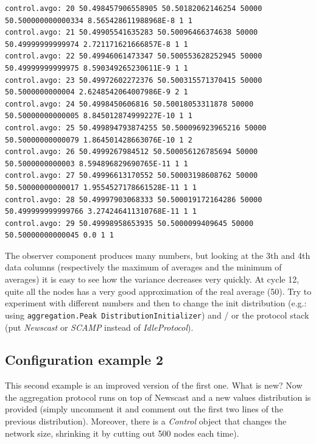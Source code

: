 \documentclass[a4paper,11pt]{article}
\begin{document}
\begin{verbatim}
control.avgo: 20 50.498457906558905 50.50182062146254 50000 50.500000000000334 8.565428611988968E-8 1 1
control.avgo: 21 50.49905541635283 50.50096466374638 50000 50.49999999999974 2.721171621666857E-8 1 1
control.avgo: 22 50.49946061473347 50.500553628252945 50000 50.49999999999975 8.590349265230611E-9 1 1
control.avgo: 23 50.49972602272376 50.500315571370415 50000 50.5000000000004 2.6248542064007986E-9 2 1
control.avgo: 24 50.4998450606816 50.50018053311878 50000 50.50000000000005 8.845012874999227E-10 1 1
control.avgo: 25 50.499894793874255 50.500096923965216 50000 50.50000000000079 1.864501428663076E-10 1 2
control.avgo: 26 50.4999267984512 50.500056126785694 50000 50.5000000000003 8.594896829690765E-11 1 1
control.avgo: 27 50.49996613170552 50.50003198608762 50000 50.50000000000017 1.9554527178661528E-11 1 1
control.avgo: 28 50.49997903068333 50.500019172164286 50000 50.499999999999766 3.274246411310768E-11 1 1
control.avgo: 29 50.49998958653935 50.5000099409645 50000 50.50000000000045 0.0 1 1
\end{verbatim}
\normalsize

The observer component produces many numbers, but looking at the 3th and
4th data columns (respectively the maximum of averages and the minimum
of averages) it is easy to see how the variance decreases very quickly.
At cycle 12, quite all the nodes has
a very good approximation of the real average (50). Try to experiment
with different numbers and then to change the init distribution (e.g.:
using \texttt{aggregation.Peak DistributionInitializer}) and / or the
protocol stack (put \emph{Newscast} or \emph{SCAMP} instead of 
\emph{IdleProtocol}).


\subsection{Configuration example 2}

This second example is an improved version of the first one. What is
new? Now the aggregation protocol runs on top of Newscast and a new
values distribution is provided (simply uncomment it and comment out
the first two lines of the previous distribution). Moreover, there is
a \emph{Control} object that changes the network size, shrinking it by
cutting out 500 nodes each time).
\end{document}
